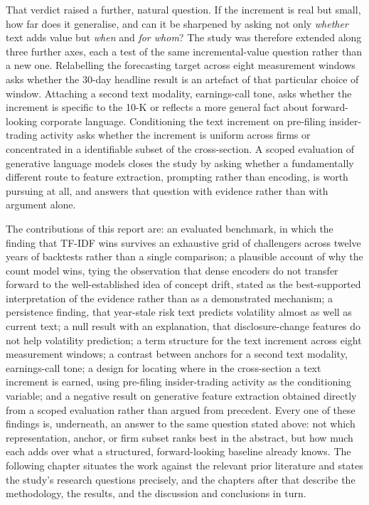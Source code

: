 \documentclass[logo,msc,ai]{infthesis}        %
\begin{document}
That verdict raised a further, natural question. If the increment is real but small, how far does it generalise, and can it be sharpened by asking not only \emph{whether} text adds value but \emph{when} and \emph{for whom}? The study was therefore extended along three further axes, each a test of the same incremental-value question rather than a new one. Relabelling the forecasting target across eight measurement windows asks whether the 30-day headline result is an artefact of that particular choice of window. Attaching a second text modality, earnings-call tone, asks whether the increment is specific to the 10-K or reflects a more general fact about forward-looking corporate language. Conditioning the text increment on pre-filing insider-trading activity asks whether the increment is uniform across firms or concentrated in a identifiable subset of the cross-section. A scoped evaluation of generative language models closes the study by asking whether a fundamentally different route to feature extraction, prompting rather than encoding, is worth pursuing at all, and answers that question with evidence rather than with argument alone.

The contributions of this report are: an evaluated benchmark, in which the finding that TF-IDF wins survives an exhaustive grid of challengers across twelve years of backtests rather than a single comparison; a plausible account of why the count model wins, tying the observation that dense encoders do not transfer forward to the well-established idea of concept drift, stated as the best-supported interpretation of the evidence rather than as a demonstrated mechanism; a persistence finding, that year-stale risk text predicts volatility almost as well as current text; a null result with an explanation, that disclosure-change features do not help volatility prediction; a term structure for the text increment across eight measurement windows; a contrast between anchors for a second text modality, earnings-call tone; a design for locating where in the cross-section a text increment is earned, using pre-filing insider-trading activity as the conditioning variable; and a negative result on generative feature extraction obtained directly from a scoped evaluation rather than argued from precedent. Every one of these findings is, underneath, an answer to the same question stated above: not which representation, anchor, or firm subset ranks best in the abstract, but how much each adds over what a structured, forward-looking baseline already knows. The following chapter situates the work against the relevant prior literature and states the study's research questions precisely, and the chapters after that describe the methodology, the results, and the discussion and conclusions in turn.
\end{document}

